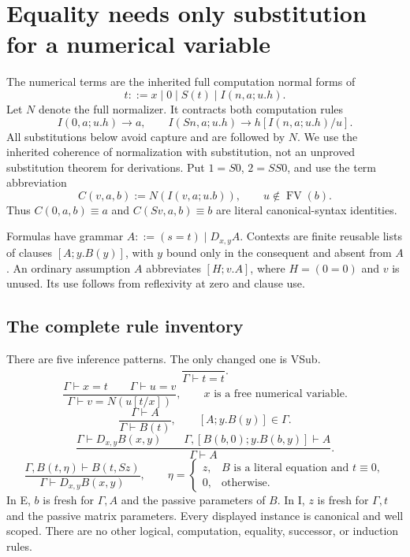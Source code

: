 
\section{Equality needs only substitution for a numerical variable}
\label{sec:variable-equality}

The numerical terms are the inherited full computation normal forms of
\[
 t::=x\mid0\mid S(t)\mid I(n,a;u.h).
\]
Let $N$ denote the full normalizer. It contracts both computation rules
\[
 I(0,a;u.h)\longrightarrow a,\qquad
 I(Sn,a;u.h)\longrightarrow h[I(n,a;u.h)/u].
\]
All substitutions below avoid capture and are followed by $N$. We use
the inherited coherence of normalization with substitution, not an
unproved substitution theorem for derivations. Put $1=S0$, $2=SS0$,
and use the term abbreviation
\[
 C(v,a,b):=N(I(v,a;u.b)),\qquad u\notin\operatorname{FV}(b).
\]
Thus $C(0,a,b)\equiv a$ and $C(Sv,a,b)\equiv b$ are literal
canonical-syntax identities.

Formulas have grammar $A::=(s=t)\mid D_{x,y}A$. Contexts are finite
reusable lists of clauses $[A;y.B(y)]$, with $y$ bound only in the
consequent and absent from $A$. An ordinary assumption $A$ abbreviates
$[H;v.A]$, where $H=(0=0)$ and $v$ is unused. Its use follows from
reflexivity at zero and clause use.

\subsection{The complete rule inventory}

There are five inference patterns. The only changed one is VSub.
\[
 \frac{}{\Gamma\vdash t=t}.\tag{Refl}
\]
\[
 \frac{\Gamma\vdash x=t\qquad\Gamma\vdash u=v}
      {\Gamma\vdash v=N(u[t/x])},
 \qquad x\text{ is a free numerical variable}.\tag{VSub}
\]
\[
 \frac{\Gamma\vdash A}{\Gamma\vdash B(t)},
 \qquad[A;y.B(y)]\in\Gamma.\tag{Use}
\]
\[
 \frac{\Gamma\vdash D_{x,y}B(x,y)\qquad
       \Gamma,[B(b,0);y.B(b,y)]\vdash A}
      {\Gamma\vdash A}.\tag{E}
\]
\[
 \frac{\Gamma,B(t,\eta)\vdash B(t,Sz)}
      {\Gamma\vdash D_{x,y}B(x,y)},\qquad
 \eta=\begin{cases}
 z,&B\text{ is a literal equation and }t\equiv0,\\
 0,&\text{otherwise}.
 \end{cases}\tag{I}
\]
In E, $b$ is fresh for $\Gamma,A$ and the passive parameters of $B$.
In I, $z$ is fresh for $\Gamma,t$ and the passive matrix parameters.
Every displayed instance is canonical and well scoped. There are no
other logical, computation, equality, successor, or induction rules.


